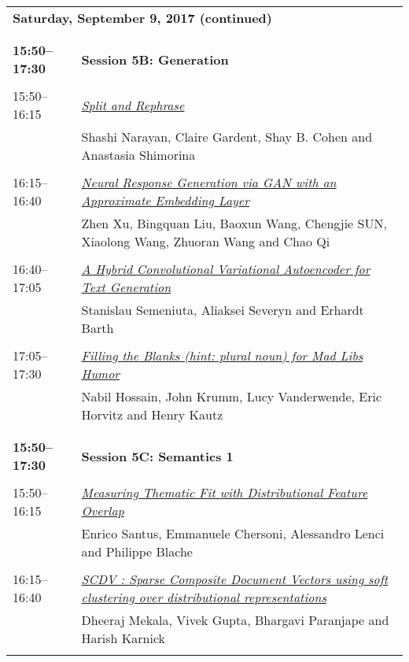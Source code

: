 \begin{tabular}{p{20mm}p{128mm}}
\\
\multicolumn{2}{l}{\bf Saturday, September 9, 2017 (continued)} \\\\
\\{\bf 15:50--17:30} & {\bf Session 5B: Generation } \\
\\
15:50--16:15 & \hyperlink{page.615}{\em Split and Rephrase}\\
         & Shashi Narayan, Claire Gardent, Shay B. Cohen and Anastasia Shimorina \\
\\

16:15--16:40 & \hyperlink{page.626}{\em Neural Response Generation via GAN with an Approximate Embedding Layer}\\
         & Zhen Xu, Bingquan Liu, Baoxun Wang, Chengjie SUN, Xiaolong Wang, Zhuoran Wang and Chao Qi \\
\\

16:40--17:05 & \hyperlink{page.636}{\em A Hybrid Convolutional Variational Autoencoder for Text Generation}\\
         & Stanislau Semeniuta, Aliaksei Severyn and Erhardt Barth \\
\\

17:05--17:30 & \hyperlink{page.647}{\em Filling the Blanks (hint: plural noun) for Mad Libs Humor}\\
         & Nabil Hossain, John Krumm, Lucy Vanderwende, Eric Horvitz and Henry Kautz \\
\\

\\{\bf 15:50--17:30} & {\bf Session 5C: Semantics 1 } \\
\\
15:50--16:15 & \hyperlink{page.657}{\em Measuring Thematic Fit with Distributional Feature Overlap}\\
         & Enrico Santus, Emmanuele Chersoni, Alessandro Lenci and Philippe Blache \\
\\

16:15--16:40 & \hyperlink{page.668}{\em SCDV : Sparse Composite Document Vectors using soft clustering over distributional representations}\\
         & Dheeraj Mekala, Vivek Gupta, Bhargavi Paranjape and Harish Karnick \\
\\


\end{tabular}
